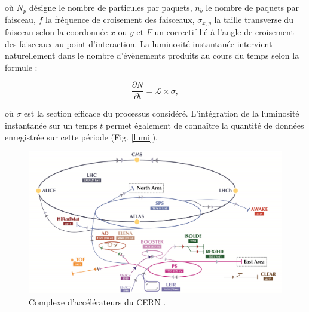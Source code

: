 où $N_p$ désigne le nombre de particules par paquets, $n_b$ le nombre de paquets par faisceau, $f$ la fréquence de croisement des faisceaux, $\sigma_{x,y}$ la taille transverse du faisceau selon la coordonnée $x$ ou $y$ et $F$ un correctif lié à l'angle de croisement des faisceaux au point d'interaction. La luminosité instantanée intervient naturellement dans le nombre d'évènements produits au cours du temps selon la formule : 

\begin{equation}
    \frac{\partial N}{\partial t}=\mathcal{L}\times\sigma,
\end{equation}

où $\sigma$ est la section efficace du processus considéré. L'intégration de la luminosité instantanée sur un temps $t$ permet également de connaître la quantité de données enregistrée sur cette période (Fig. \ref{lumi}).  \\

\begin{figure}
\centering
    \includegraphics[scale=0.18]{Chapitre3/Images/cern-complex.jpg} 
\caption{Complexe d'accélérateurs du CERN \cite{CERNacc}.}
\label{complex}
\end{figure}

